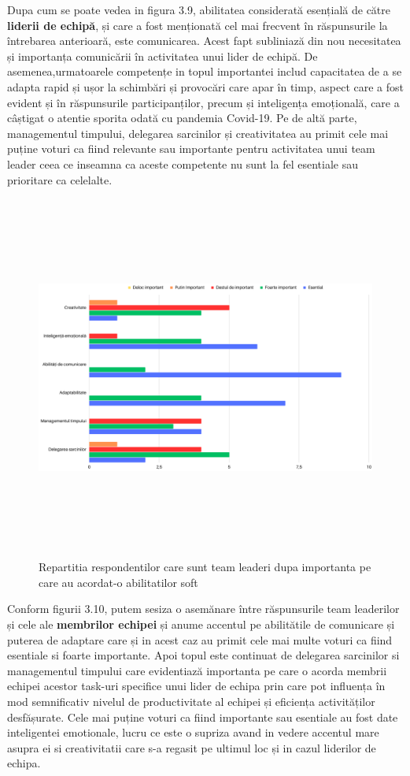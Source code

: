 \documentclass[a4paper, 12pt]{article}
\begin{document}
\begin{enumerate}[A)]
	\quad Dupa cum se poate vedea in figura 3.9, abilitatea considerată esențială de către \textbf{liderii de echipă}, și care a fost menționată cel mai frecvent în răspunsurile la întrebarea anterioară, este comunicarea. Acest fapt subliniază din nou necesitatea și importanța comunicării în activitatea unui lider de echipă. De asemenea,urmatoarele competențe in topul importantei includ capacitatea de a se adapta rapid și ușor la schimbări și provocări care apar în timp, aspect care a fost evident și în răspunsurile participanților, precum și inteligența emoțională, care a câștigat o atentie sporita odată cu pandemia Covid-19. Pe de altă parte, managementul timpului, delegarea sarcinilor și creativitatea au primit cele mai puține voturi ca fiind relevante sau importante pentru activitatea unui team leader ceea ce inseamna ca aceste competente nu sunt la fel esentiale sau prioritare ca celelalte.

	\begin{figure}[!htb]
			\centering
			\includegraphics[width=17cm, height=12cm]{"figures/team leaders (2).png"}
			\caption {Repartitia respondentilor care sunt team leaderi dupa importanta pe care au acordat-o abilitatilor soft}\label{fig:four}
			
		\end{figure}


	\quad Conform figurii 3.10, putem sesiza o asemănare între răspunsurile team leaderilor și cele ale \textbf{membrilor echipei} și anume accentul pe abilitătile de comunicare și puterea de adaptare care și in acest caz au primit cele mai multe voturi ca fiind esentiale si foarte importante. Apoi topul este continuat de delegarea sarcinilor si managementul timpului care evidentiază importanta pe care o acorda membrii echipei acestor task-uri specifice unui lider de echipa prin care pot influența în mod semnificativ nivelul de productivitate al echipei și eficiența activităților desfășurate. Cele mai puține voturi ca fiind importante sau esentiale au fost date inteligentei emotionale, lucru ce este o supriza avand in vedere accentul mare asupra ei si creativitatii care s-a regasit  pe ultimul loc și in cazul liderilor de echipa.



\end{enumerate}
\end{document}
